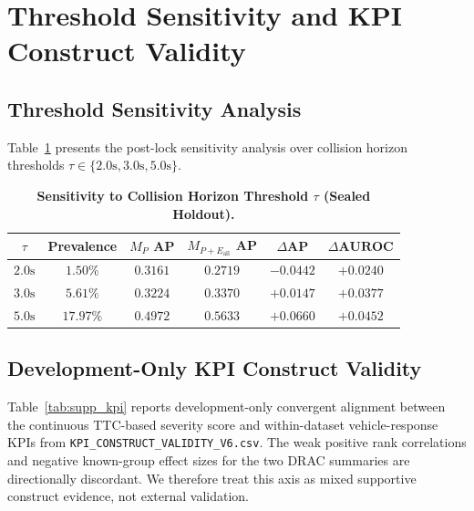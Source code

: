 \section{Threshold Sensitivity and KPI Construct Validity}
\label{sec:supp_sensitivity}

\subsection{Threshold Sensitivity Analysis}
Table~\ref{tab:supp_sensitivity} presents the post-lock sensitivity analysis over collision horizon thresholds $\tau \in \{2.0\text{s}, 3.0\text{s}, 5.0\text{s}\}$.

\begin{table}[h]
\centering
\footnotesize
\setlength{\tabcolsep}{4.5pt}
\renewcommand{\arraystretch}{0.88}
\vspace{-3mm}
\caption{\textbf{Sensitivity to Collision Horizon Threshold $\tau$ (Sealed Holdout).}}
\label{tab:supp_sensitivity}
\begin{tabular}{cccccc}
\toprule
$\tau$ & \textbf{Prevalence} & $M_P$ \textbf{AP} & $M_{P+E_{\text{all}}}$ \textbf{AP} & $\Delta\textbf{AP}$ & $\Delta\textbf{AUROC}$ \\
\midrule
$2.0\text{s}$ & $1.50\%$ & $0.3161$ & $0.2719$ & $-0.0442$ & $+0.0240$ \\
$3.0\text{s}$ & $5.61\%$ & $0.3224$ & $0.3370$ & $+0.0147$ & $+0.0377$ \\
$5.0\text{s}$ & $17.97\%$ & $0.4972$ & $0.5633$ & $+0.0660$ & $+0.0452$ \\
\bottomrule
\end{tabular}
\end{table}

\subsection{Development-Only KPI Construct Validity}
Table~\ref{tab:supp_kpi} reports development-only convergent alignment between the continuous TTC-based severity score and within-dataset vehicle-response KPIs from \texttt{KPI\_CONSTRUCT\_VALIDITY\_V6.csv}.
The weak positive rank correlations and negative known-group effect sizes for the two DRAC summaries are directionally discordant. We therefore treat this axis as mixed supportive construct evidence, not external validation.

